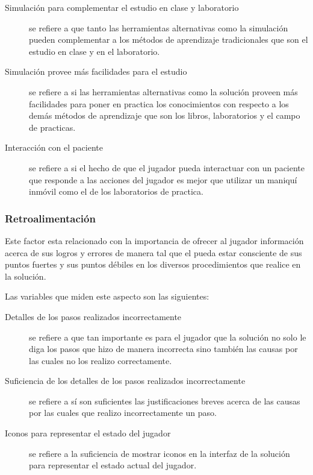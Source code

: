 \begin{description}

\item[Simulación para complementar el estudio en clase y laboratorio] se
    refiere a que tanto las herramientas alternativas como la simulación pueden
    complementar a los métodos de aprendizaje tradicionales que son el estudio
    en clase y en el laboratorio.

\item[Simulación provee más facilidades para el estudio] se refiere a si las
    herramientas alternativas como la solución proveen más facilidades para
    poner en practica los conocimientos con respecto a los demás métodos de
    aprendizaje que son los libros, laboratorios y el campo de practicas.

\item[Interacción con el paciente] se refiere a si el hecho de que el jugador
    pueda interactuar con un paciente que responde a las acciones del jugador es
    mejor que utilizar un maniquí inmóvil como el de los laboratorios de
    practica.

\end{description}

\subsubsection{Retroalimentación}
\label{sec:sub_retroalimentacion}

Este factor esta relacionado con la importancia de ofrecer al jugador
información acerca de sus logros y errores de manera tal que el pueda estar
consciente de sus puntos fuertes y sus puntos débiles en los diversos
procedimientos que realice en la solución.

Las variables que miden este aspecto son las siguientes:

\begin{description}

\item[Detalles de los pasos realizados incorrectamente] se refiere a que tan
    importante es para el jugador que la solución no solo le diga los pasos que
    hizo de manera incorrecta sino también las causas por las cuales no los
    realizo correctamente.

\item[Suficiencia de los detalles de los pasos realizados incorrectamente] se
    refiere a sí son suficientes las justificaciones breves acerca de las causas
    por las cuales que realizo incorrectamente un paso.

\item[Iconos para representar el estado del jugador] se refiere a la
    suficiencia de mostrar iconos en la interfaz de la solución para
    representar el estado actual del jugador.

\end{description}

